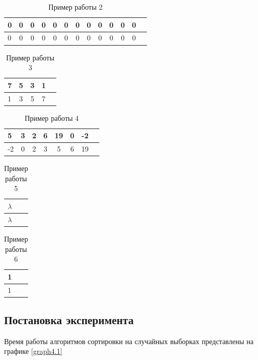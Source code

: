 \documentclass[12pt,a4paper]{scrartcl}
\begin{document}
\begin{table}[ht]
	\caption{Пример работы 2}
	\begin{tabular}{|l|c|c|c|c|c|c|c|c|c|c|c|c|}
		\hline
		 0 & 0 & 0 & 0 & 0 & 0 & 0 & 0 & 0 & 0 & 0 & 0\\
		\hline
		\hline
		 0 & 0 & 0 & 0 & 0 & 0 & 0 & 0 & 0 & 0 & 0 & 0\\
		\hline
	\end{tabular}
	\label{tab:tabular}
\end{table}

\begin{table}[ht]
	\caption{Пример работы 3}
	\begin{tabular}{|l|c|c|c|c|}
		\hline
		7 & 5 & 3 & 1 \\
		\hline
		\hline
		1 & 3 & 5 & 7 \\
		\hline
	\end{tabular}
	\label{tab:tabular}
\end{table}

\begin{table}[ht]
	\caption{Пример работы 4}
	\begin{tabular}{|l|c|c|c|c|c|c|c|}
		\hline
		5 & 3 & 2 & 6 & 19 & 0 & -2\\
		\hline
		\hline
		-2 & 0 & 2 & 3  & 5 & 6 & 19\\
		\hline
	\end{tabular}
	\label{tab:tabular}
\end{table}

\begin{table}[ht]
	\caption{Пример работы 5}
	\begin{tabular}{|l|}
		\hline
		$\lambda$\\
		\hline
		\hline
		$\lambda$\\
		\hline
	\end{tabular}
	\label{tab:tabular}
\end{table}

\begin{table}[ht]
	\caption{Пример работы 6}
	\begin{tabular}{|l|}
		\hline
		1\\
		\hline
		\hline
		 1\\
		\hline
	\end{tabular}
	\label{tab:tabular}
\end{table}

\subsection{Постановка эксперимента}  
\newpage
Время работы алгоритмов сортировки на случайных выборках представлены на графике \ref{graph4.1}
\end{document}
